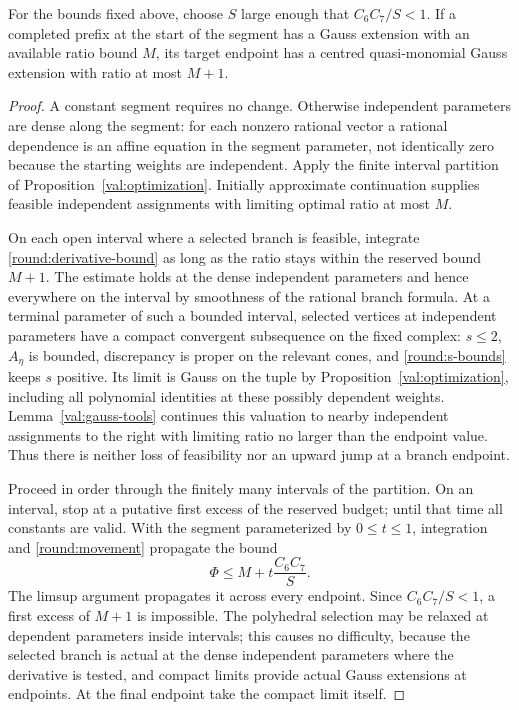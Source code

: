 \begin{lemma}\label{round:segment}
For the bounds fixed above, choose $S$ large enough that
$C_6C_7/S<1$. If a completed prefix at the start of the segment
has a Gauss extension with an available ratio bound $M$, its
target endpoint has a centred quasi-monomial Gauss extension
with ratio at most $M+1$.
\end{lemma}

\begin{proof}
A constant segment requires no change. Otherwise independent
parameters are dense along the segment: for each nonzero
rational vector a rational dependence is an affine equation
in the segment parameter, not identically zero because the
starting weights are independent. Apply the finite interval
partition of Proposition~\ref{val:optimization}. Initially
approximate continuation supplies feasible independent
assignments with limiting optimal ratio at most $M$.

On each open interval where a selected branch is feasible,
integrate \eqref{round:derivative-bound} as long as the ratio
stays within the reserved bound $M+1$. The estimate holds at
the dense independent parameters and hence everywhere on
the interval by smoothness of the rational branch formula.
At a terminal parameter of such a bounded interval, selected
vertices at independent parameters have a compact convergent
subsequence on the fixed complex: $s\le2$, $A_\eta$ is bounded,
discrepancy is proper on the relevant cones, and
\eqref{round:s-bounds} keeps $s$ positive. Its limit is Gauss
on the tuple by Proposition~\ref{val:optimization}, including
all polynomial identities at these possibly dependent weights.
Lemma~\ref{val:gauss-tools} continues this valuation to nearby
independent assignments to the right with limiting ratio no
larger than the endpoint value. Thus there is neither loss
of feasibility nor an upward jump at a branch endpoint.

Proceed in order through the finitely many intervals of the
partition. On an interval, stop at a putative first excess
of the reserved budget; until that time all constants are
valid. With the segment parameterized by $0\le t\le1$,
integration and \eqref{round:movement} propagate the bound
\[
 \Phi\le M+t\frac{C_6C_7}{S}.
\]
The limsup argument propagates it across every endpoint.
Since $C_6C_7/S<1$, a first excess of $M+1$ is impossible.
The polyhedral selection may be relaxed at dependent
parameters inside intervals; this causes no difficulty,
because the selected branch is actual at the dense
independent parameters where the derivative is tested, and
compact limits provide actual Gauss extensions at endpoints.
At the final endpoint take the compact limit itself.
\end{proof}


